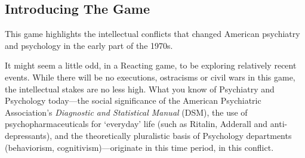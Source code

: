 \begin{refsection}
\def\mysubtitle{The struggle for legitimacy of psychology and psychiatry in the 1970’s\\ \large Game Book}

\maketitle






\frontmatter
\startcontents[gamebook]

\newpage
{}%

\newpage
{}%
% 


\mainmatter

\pagebreak 

\chapter{Introducing The Game}
\label{introducingthegame}

This game highlights the intellectual conflicts that changed American psychiatry and psychology in the early part of the 1970s.

It might seem a little odd, in a Reacting game, to be exploring relatively recent events. While there will be no executions, ostracisms or civil wars in this game, the intellectual stakes are no less high. What you know of Psychiatry and Psychology today---the social significance of the American Psychiatric Association’s \emph{Diagnostic and Statistical Manual }(DSM), the use of psychopharmaceuticals for `everyday' life (such as Ritalin, Adderall and anti-depressants), and the theoretically pluralistic basis of Psychology departments (behaviorism, cognitivism)---originate in this time period, in this conflict. 


\end{refsection}
